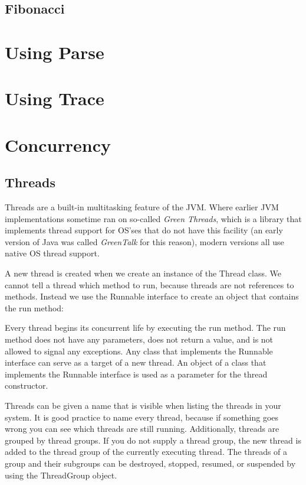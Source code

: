 {\section{Fibonacci}

\chapter{Using Parse}
\chapter{Using Trace}

\chapter{Concurrency}
\section{Threads}
Threads are a built-in multitasking feature of the JVM. Where earlier
JVM implementations sometime ran on so-called \emph{Green Threads},
which is a library that implements thread support for OS'ses that do
not have this facility (an
early version of Java was called \emph{GreenTalk} for this reason), modern versions
all use native OS thread support. 

A new thread is created when we create an instance of the Thread class. We cannot tell a thread which method to run, because threads are not references to methods. Instead we use the Runnable interface to create an object that contains the run method:

Every thread begins its concurrent life by executing the run method. The run method does not have any parameters, does not return a value, and is not allowed to signal any exceptions.
Any class that implements the Runnable interface can serve as a target of a new thread. An object of a class that implements the Runnable interface is used as a parameter for the thread constructor.

Threads can be given a name that is visible when listing the threads in your system. It is good practice to name every thread, because if something goes wrong you can see which threads are still running.
Additionally, threads are grouped by thread groups. If you do not
supply a thread group, the new thread is added to the thread group of
the currently executing thread. The threads of a group and their
subgroups can be destroyed, stopped, resumed, or suspended by using
the ThreadGroup object. 

}
